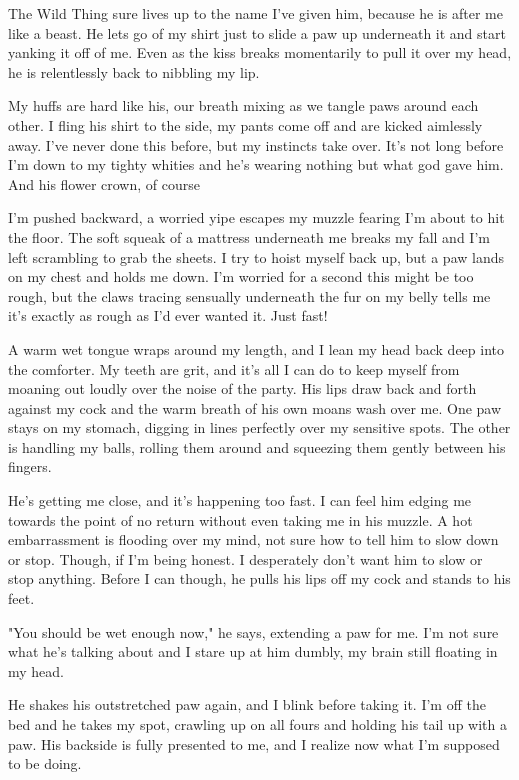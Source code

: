 The Wild Thing sure lives up to the name I've given him, because he is after me like a beast. He lets go of my shirt just to slide a paw up underneath it and start yanking it off of me. Even as the kiss breaks momentarily to pull it over my head, he is relentlessly back to nibbling my lip.

My huffs are hard like his, our breath mixing as we tangle paws around each other. I fling his shirt to the side, my pants come off and are kicked aimlessly away. I've never done this before, but my instincts take over. It's not long before I'm down to my tighty whities and he's wearing nothing but what god gave him. And his flower crown, of course

I'm pushed backward, a worried yipe escapes my muzzle fearing I'm about to hit the floor. The soft squeak of a mattress underneath me breaks my fall and I'm left scrambling to grab the sheets. I try to hoist myself back up, but a paw lands on my chest and holds me down. I'm worried for a second this might be too rough, but the claws tracing sensually underneath the fur on my belly tells me it's exactly as rough as I'd ever wanted it. Just fast!

A warm wet tongue wraps around my length, and I lean my head back deep into the comforter. My teeth are grit, and it's all I can do to keep myself from moaning out loudly over the noise of the party. His lips draw back and forth against my cock and the warm breath of his own moans wash over me. One paw stays on my stomach, digging in lines perfectly over my sensitive spots. The other is handling my balls, rolling them around and squeezing them gently between his fingers.

He's getting me close, and it's happening too fast. I can feel him edging me towards the point of no return without even taking me in his muzzle. A hot embarrassment is flooding over my mind, not sure how to tell him to slow down or stop. Though, if I'm being honest. I desperately don't want him to slow or stop anything. Before I can though, he pulls his lips off my cock and stands to his feet.

"You should be wet enough now," he says, extending a paw for me. I'm not sure what he's talking about and I stare up at him dumbly, my brain still floating in my head.

He shakes his outstretched paw again, and I blink before taking it. I'm off the bed and he takes my spot, crawling up on all fours and holding his tail up with a paw. His backside is fully presented to me, and I realize now what I'm supposed to be doing.

